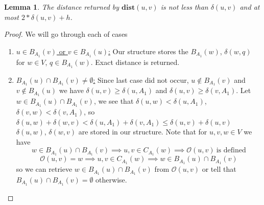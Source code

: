 \documentclass[shortabstract, lic, english]{iithesis}
\theoremstyle{definition} \newtheorem{definition}{Definition}[chapter]
\theoremstyle{remark} \newtheorem{remark}[definition]{Observation}
\theoremstyle{plain} \newtheorem{theorem}[definition]{Theorem}
\theoremstyle{plain} \newtheorem{lemma}[definition]{Lemma}
\theoremstyle{plain} \newtheorem{conjecture}[definition]{Conjecture}
\begin{document}
\begin{lemma}
    The distance returned by $\mathbf{dist}(u, v)$ is not less than $\delta(u,v)$ and at most $2 * \delta(u,v) + h$.
\end{lemma}
\begin{proof}
    We will go through each of cases
    \begin{enumerate}
        \item \underline{$u \in B_{A_1}(v)$ or $v \in B_{A_1}(u)$:}\newline
            Our structure stores the $B_{A_1}(w)$, $\delta(w, q)$ for $w \in V$, $q \in B_{A_1}(w)$. Exact distance is returned.
            \newpage
        \item \underline{$B_{A_1}(u) \cap B_{A_1}(v) \neq \emptyset$:}\newline
            Since last case did not occur, $u \notin B_{A_1}(v)$ and $v \notin B_{A_1}(u)$ we have $\delta(u,v) \geq \delta(u, A_1)$ and $\delta(u,v) \geq \delta(v, A_1)$.
            Let $w \in B_{A_1}(u) \cap B_{A_1}(v)$, we see that $\delta(u, w) < \delta(u, A_1)$, $\delta(v, w) < \delta(v, A_1)$,
            so $\delta(u, w) + \delta(w, v) < \delta(u, A_1) + \delta(v, A_1) \leq \delta(u,v) + \delta(u,v)$
            $\delta(u, w)$, $\delta(w, v)$ are stored in our structure.
            \newline
            Note that for $u,v,w \in V$ we have
            $$w \in B_{A_1}(u) \cap B_{A_1}(v) \implies u,v \in C_{A_1}(w) \implies \mathcal{O}(u,v)~\text{is defined}$$
            $$\mathcal{O}(u, v) = w \implies u,v \in C_{A_1}(w) \implies w \in B_{A_1}(u) \cap B_{A_1}(v)$$
            so we can retrieve $w \in B_{A_1}(u) \cap B_{A_1}(v)$ from $\mathcal{O}(u,v)$ or tell that $B_{A_1}(u) \cap B_{A_1}(v) = \emptyset$ otherwise.


\end{enumerate}
\end{proof}
\end{document}
